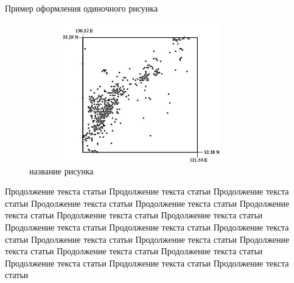 Пример оформления одиночного рисунка

\begin{figure}[ht]
\centerline{\includegraphics[width=3.83in,height=2.38in]{ris_01_a.png}}
\caption{название рисунка}
\label{fig1}
\end{figure}

Продолжение текста статьи Продолжение текста статьи Продолжение текста статьи Продолжение текста статьи Продолжение текста статьи Продолжение текста статьи Продолжение текста статьи Продолжение текста статьи Продолжение текста статьи Продолжение текста статьи Продолжение текста статьи Продолжение текста статьи Продолжение текста статьи Продолжение текста статьи Продолжение текста статьи Продолжение текста статьи Продолжение текста статьи Продолжение текста статьи Продолжение текста статьи 

